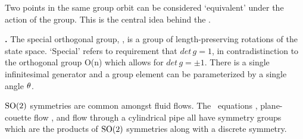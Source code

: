 {Two points in the same group orbit can be considered `equivalent' under the action of the group. This is the central idea behind the \mslices.

\begin{definition}
\label{def:SO2}
\textbf{.} The special orthogonal group, , is a group of length-preserving rotations of the state space. `Special'  refers to requirement that $det \, g = 1$, in contradistinction to the orthogonal group O(n) which allows for $det \, g = \pm 1$. There is a single infinitesimal generator and a group element can be parameterized by a single angle ${\bf \theta}$.
\end{definition}

$\textrm{SO}(2)$ symmetries are common amongst fluid flows. The \KS\ equations , plane-couette flow , and flow through a cylindrical pipe  all have symmetry groups which are the products  of $\textrm{SO}(2)$ symmetries along with a discrete symmetry.

}
